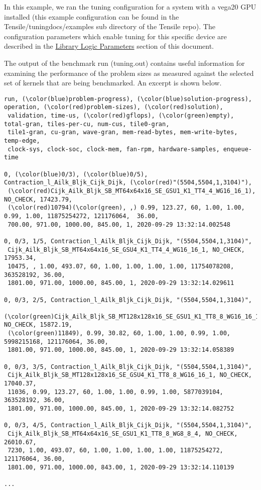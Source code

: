 \documentclass[]{article}
\begin{document}
In this example, we ran the tuning configuration for a system with a vega20 GPU installed (this example configuration can be found in the Tensile/tuning\textunderscore docs/examples sub directory of the Tensile repo). The configuration parameters which enable tuning for this specific device are described in the \hyperref[sec:LibraryLogic]{Library  Logic Parameters} section of this document.

The output of the benchmark run (tuning.out) contains useful information for examining the performance of the problem sizes as measured against the selected set of kernels that are being benchmarked. An excerpt is shown below.

\begin{Verbatim}[frame=single,commandchars=\\\(\)]
run, (\color(blue)problem-progress), (\color(blue)solution-progress), operation, (\color(red)problem-sizes), (\color(red)solution),
 validation, time-us, (\color(red)gflops), (\color(green)empty), total-gran, tiles-per-cu, num-cus, tile0-gran,
 tile1-gran, cu-gran, wave-gran, mem-read-bytes, mem-write-bytes, temp-edge,
 clock-sys, clock-soc, clock-mem, fan-rpm, hardware-samples, enqueue-time

0, (\color(blue)0/3), (\color(blue)0/5), Contraction_l_Ailk_Bljk_Cijk_Dijk, (\color(red)"(5504,5504,1,3104)"),
 (\color(red)Cijk_Ailk_Bljk_SB_MT64x64x16_SE_GSU1_K1_TT4_4_WG16_16_1), NO_CHECK, 17423.79,
 (\color(red)10794)(\color(green), ,) 0.99, 123.27, 60, 1.00, 1.00, 0.99, 1.00, 11875254272, 121176064,  36.00,
 700.00, 971.00, 1000.00, 845.00, 1, 2020-09-29 13:32:14.002548

0, 0/3, 1/5, Contraction_l_Ailk_Bljk_Cijk_Dijk, "(5504,5504,1,3104)",
 Cijk_Ailk_Bljk_SB_MT64x64x16_SE_GSU4_K1_TT4_4_WG16_16_1, NO_CHECK, 17953.34,
 10475, , 1.00, 493.07, 60, 1.00, 1.00, 1.00, 1.00, 11754078208, 363528192, 36.00,
 1801.00, 971.00, 1000.00, 845.00, 1, 2020-09-29 13:32:14.029611

0, 0/3, 2/5, Contraction_l_Ailk_Bljk_Cijk_Dijk, "(5504,5504,1,3104)",
 (\color(green)Cijk_Ailk_Bljk_SB_MT128x128x16_SE_GSU1_K1_TT8_8_WG16_16_1), NO_CHECK, 15872.19,
 (\color(green)11849), 0.99, 30.82, 60, 1.00, 1.00, 0.99, 1.00, 5998215168, 121176064, 36.00,
 1801.00, 971.00, 1000.00, 845.00, 1, 2020-09-29 13:32:14.058389

0, 0/3, 3/5, Contraction_l_Ailk_Bljk_Cijk_Dijk, "(5504,5504,1,3104)",
 Cijk_Ailk_Bljk_SB_MT128x128x16_SE_GSU4_K1_TT8_8_WG16_16_1, NO_CHECK, 17040.37,
 11036, 0.99, 123.27, 60, 1.00, 1.00, 0.99, 1.00, 5877039104, 363528192, 36.00,
 1801.00, 971.00, 1000.00, 845.00, 1, 2020-09-29 13:32:14.082752

0, 0/3, 4/5, Contraction_l_Ailk_Bljk_Cijk_Dijk, "(5504,5504,1,3104)",
 Cijk_Ailk_Bljk_SB_MT64x64x16_SE_GSU1_K1_TT8_8_WG8_8_4, NO_CHECK, 26010.67,
 7230, 1.00, 493.07, 60, 1.00, 1.00, 1.00, 1.00, 11875254272, 121176064, 36.00,
 1801.00, 971.00, 1000.00, 843.00, 1, 2020-09-29 13:32:14.110139

...
\end{Verbatim}
\end{document}
